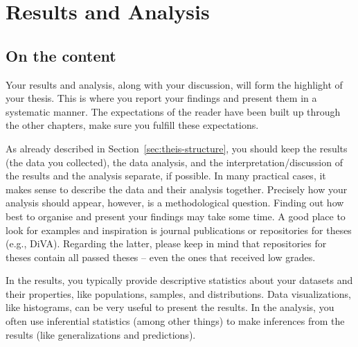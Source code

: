 \chapter{Results and Analysis}
\label{chp:results}
\section{On the content}
Your results and analysis, along with your discussion, will form the highlight of your thesis. This is where you report your findings and present them in a systematic manner. The expectations of the reader have been built up through the other chapters, make sure you fulfill these expectations.

As already described in Section~\ref{sec:theis-structure}, you should keep the results (the data you collected), the data analysis, and the interpretation/discussion of the results and the analysis separate, if possible. In many practical cases, it makes sense to describe the data and their analysis together.
Precisely how your analysis should appear, however, is a methodological question. Finding out how best to organise and present your findings may take some time. A good place to look for examples and inspiration is journal publications or repositories for theses (e.g., DiVA). Regarding the latter, please keep in mind that repositories for theses contain all passed theses -- even the ones that received low grades. 

In the results, you typically provide descriptive statistics about your datasets and their properties, like populations, samples, and distributions.
Data visualizations, like histograms, can be very useful to present the results. In the analysis, you often use inferential statistics (among other things) to make inferences from the results (like generalizations and predictions).